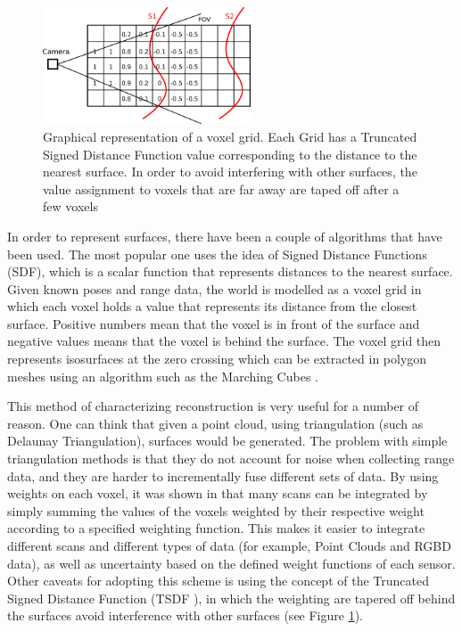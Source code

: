 \documentclass[12pt]{article}
\begin{document}
\begin{figure}
	\centering
	\includegraphics[width=0.55\textwidth]{TSDF}
	\caption[t]{Graphical representation of a voxel grid. Each Grid has a Truncated Signed Distance Function value corresponding to the distance to the nearest surface. In order to avoid interfering with other surfaces, the value assignment to voxels that are far away are taped off after a few voxels}
	\label{fig:TSDF}
\end{figure}
	
In order to represent surfaces, there have been a couple of algorithms that have been used. The most popular one uses the idea of Signed Distance Functions (SDF), which is a scalar function that represents distances to the nearest surface. Given known poses and range data, the world is modelled as a voxel grid in which each voxel holds  a value that represents its distance from the closest surface. Positive numbers mean that the voxel is in front of the surface and negative values means that the voxel is behind the surface. The voxel grid then represents isosurfaces at the zero crossing which can be extracted in polygon meshes using an algorithm such as the Marching Cubes \cite{marchingcubes}.
	
This method of characterizing reconstruction is very useful for a number of reason. One can think that given a point cloud, using triangulation (such as Delaunay Triangulation), surfaces would be generated. The problem with simple triangulation methods is that they do not account for noise when collecting range data, and they are harder to incrementally fuse different sets of data. By using weights on each voxel, it was shown in \cite{TSDF} that many scans can be integrated by simply summing the values of the voxels weighted by their respective weight according to a specified weighting function. This makes it easier to integrate different scans and different types of data (for example, Point Clouds and RGBD data), as well as uncertainty based on the defined weight functions of each sensor. Other caveats for adopting this scheme is using the concept of the Truncated Signed Distance Function (TSDF \cite{TSDF}), in which the weighting are tapered off behind the surfaces avoid interference with other surfaces (see Figure \ref{fig:TSDF}).
\end{document}
